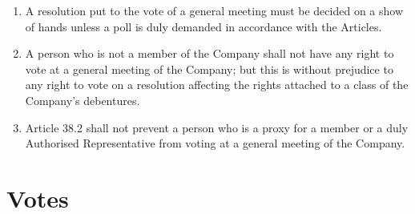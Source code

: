 \documentclass[a4paper,12pt]{article}
\begin{document}
\begin{enumerate}
  \item A resolution put to the vote of a general meeting must be decided on a show of hands unless a poll is duly demanded in accordance with the Articles.
  \color{red}
  \item A person who is not a member of the Company shall not have any right to vote at a general meeting of the Company; but this is without prejudice to any right to vote on a resolution affecting the rights attached to a class of the Company's debentures.\color{black} %
  \item Article 38.2 shall not prevent a person who is a proxy for a member or a duly Authorised Representative from voting at a general meeting of the Company.
\end{enumerate}

\section{Votes}
\end{document}
